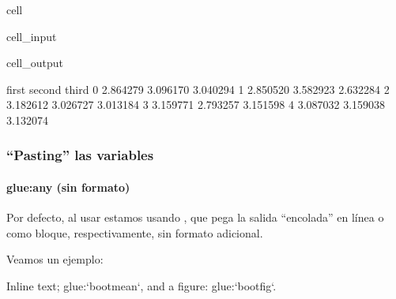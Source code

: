 \documentclass[letterpaper,10pt,english]{jupyterBook}
\begin{document}
\begin{sphinxuseclass}{cell}
\begin{sphinxVerbatimInput}
\begin{sphinxuseclass}{cell_input}
\begin{sphinxVerbatim}[commandchars=\\\{\}]
  
\end{sphinxVerbatim}

\end{sphinxuseclass}\end{sphinxVerbatimInput}
\begin{sphinxVerbatimOutput}

\begin{sphinxuseclass}{cell_output}
\begin{sphinxVerbatim}[commandchars=\\\{\}]
      first    second     third
0  2.864279  3.096170  3.040294
1  2.850520  3.582923  2.632284
2  3.182612  3.026727  3.013184
3  3.159771  2.793257  3.151598
4  3.087032  3.159038  3.132074
\end{sphinxVerbatim}

\noindent{}

\noindent{}

\end{sphinxuseclass}\end{sphinxVerbatimOutput}

\end{sphinxuseclass}

\subsubsection{“Pasting” las variables}
\label{\detokenize{docs/01_01_Code_Blocks:pasting-las-variables}}

\paragraph{glue:any (sin formato)}
\label{\detokenize{docs/01_01_Code_Blocks:glue-any-sin-formato}}
\sphinxAtStartPar
Por defecto, al usar  estamos usando , que pega la salida
“encolada” en línea o como bloque, respectivamente, sin formato adicional.

\sphinxAtStartPar
Veamos un ejemplo:

\begin{sphinxVerbatim}[commandchars=\\\{\}]
In\PYGZhy{}line text; \PYGZob{}glue:\PYGZcb{}`boot\PYGZus{}mean`, and a figure: \PYGZob{}glue:\PYGZcb{}`boot\PYGZus{}fig`.
\end{sphinxVerbatim}
\end{document}
